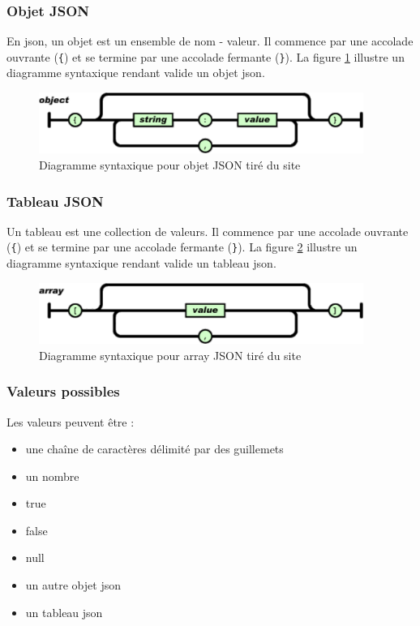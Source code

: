 \subsubsection{Objet JSON}
En \gls{json}, un objet est un ensemble de nom - valeur. Il commence par une accolade ouvrante (\texttt{\{}) et se termine par une accolade fermante (\texttt{\}}). La figure \ref{gra:jsonsyntax} illustre un diagramme syntaxique rendant valide un objet \gls{json}.

\begin{figure}[H]
      \centering
      \includegraphics[width=400px]{00_media/03_objetJson.pdf}
      \caption{Diagramme syntaxique pour objet JSON tiré du site \cite{online:jsonorg}}
      \label{gra:jsonsyntax}
\end{figure}

\subsubsection{Tableau JSON}
Un tableau est une collection de valeurs. Il commence par une accolade ouvrante (\texttt{\{}) et se termine par une accolade fermante (\texttt{\}}). La figure \ref{gra:jsonsyntaxarray} illustre un diagramme syntaxique rendant valide un tableau \gls{json}.

\begin{figure}[H]
      \centering
      \includegraphics[width=400px]{00_media/03_arrayJson.pdf}
      \caption{Diagramme syntaxique pour array JSON tiré du site \cite{online:jsonorg}}
      \label{gra:jsonsyntaxarray}
\end{figure}
\subsubsection{Valeurs possibles}
Les valeurs peuvent être : 

\medskip

\begin{itemize}
  \item une chaîne de caractères délimité par des guillemets
  \item un nombre
  \item true
  \item false
  \item null
  \item un autre objet \gls{json}
  \item un tableau \gls{json}
\end{itemize}

